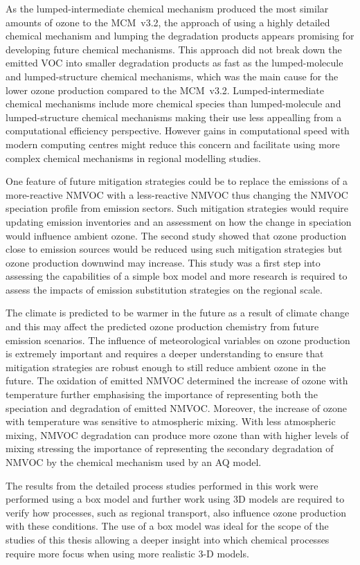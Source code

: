 As the lumped-intermediate chemical mechanism produced the most similar amounts of ozone to the MCM~v3.2, the approach of using a highly detailed chemical mechanism and lumping the degradation products appears promising for developing future chemical mechanisms.
This approach did not break down the emitted VOC into smaller degradation products as fast as the lumped-molecule and lumped-structure chemical mechanisms, which was the main cause for the lower ozone production compared to the MCM~v3.2.
Lumped-intermediate chemical mechanisms include more chemical species than lumped-molecule and lumped-structure chemical mechanisms making their use less appealling from a computational efficiency perspective.
However gains in computational speed with modern computing centres might reduce this concern and facilitate using more complex chemical mechanisms in regional modelling studies.

One feature of future mitigation strategies could be to replace the emissions of a more-reactive NMVOC with a less-reactive NMVOC thus changing the NMVOC speciation profile from emission sectors.
Such mitigation strategies would require updating emission inventories and an assessment on how the change in speciation would influence ambient ozone.
The second study showed that ozone production close to emission sources would be reduced using such mitigation strategies but ozone production downwind may increase.
This study was a first step into assessing the capabilities of a simple box model and more research is required to assess the impacts of emission substitution strategies on the regional scale.

The climate is predicted to be warmer in the future as a result of climate change and this may affect the predicted ozone production chemistry from future emission scenarios.
The influence of meteorological variables on ozone production is extremely important and requires a deeper understanding to ensure that mitigation strategies are robust enough to still reduce ambient ozone in the future.
The oxidation of emitted NMVOC determined the increase of ozone with temperature further emphasising the importance of representing both the speciation and degradation of emitted NMVOC.
Moreover, the increase of ozone with temperature was sensitive to atmospheric mixing.
With less atmospheric mixing, NMVOC degradation can produce more ozone than with higher levels of mixing stressing the importance of representing the secondary degradation of NMVOC by the chemical mechanism used by an AQ model.

The results from the detailed process studies performed in this work were performed using a box model and further work using 3D models are required to verify how processes, such as regional transport, also influence ozone production with these conditions.
The use of a box model was ideal for the scope of the studies of this thesis allowing a deeper insight into which chemical processes require more focus when using more realistic 3-D models.

